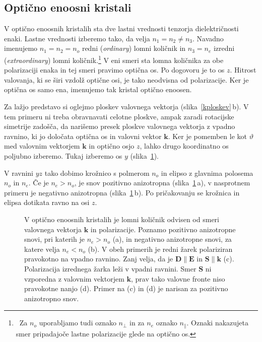 \subsection*{Optično enoosni kristali}
V optično enoosnih kristalih sta dve lastni vrednosti tenzorja dielektričnosti 
enaki. Lastne vrednosti izberemo
tako, da velja $n_{1}=n_{2}\neq n_{3}$. Navadno imenujemo
$n_{1}=n_{2}=n_{o}$ redni (\textit{ordinary})
lomni količnik  in $n_{3}=n_{e}$ izredni 
(\textit{extraordinary}) lomni količnik.\footnote{~Za $n_o$ uporabljamo tudi oznako $n_{\perp}$ in za $n_e$ oznako $n_{\parallel}$. Oznaki
nakazujeta smer pripadajoče lastne polarizacije glede na optično os.}
V eni smeri sta lomna količnika za obe polarizaciji enaka in tej smeri pravimo 
optična os. Po dogovoru je to os $z$. Hitrost valovanja, ki
se širi vzdolž optične osi, je tako neodvisna od polarizacije.
Ker je optična os samo ena, imenujemo tak kristal optično enoosen. 

Za lažjo predstavo si oglejmo ploskev valovnega vektorja (slika~\ref{kploskev}\,b). 
V tem primeru ni treba obravnavati celotne ploskve, ampak zaradi rotacijske simetrije
zadošča, da narišemo presek ploskve valovnega vektorja z vpadno ravnino, ki jo določata 
optična os in valovni vektor $\mathbf{k}$. 
Ker je pomemben le kot $\vartheta$ med valovnim vektorjem $\mathbf{k}$ 
in optično osjo $z$, lahko drugo koordinatno os poljubno izberemo. Tukaj izberemo
os $y$ (slika~\ref{fig:Elipsa}). 

V ravnini $yz$ tako dobimo krožnico s polmerom $n_o$ in elipso z glavnima polosema
$n_o$ in $n_e$. Če je $n_e>n_o$, je snov pozitivno anizotropna (slika~\ref{fig:Elipsa}\,a), 
v nasprotnem primeru je negativno anizotropna (slika~\ref{fig:Elipsa}\,b). Po 
pričakovanju se krožnica in elipsa dotikata ravno na osi $z$. 
\begin{figure}[ht]
\centering
\def\svgwidth{140truemm} 

\caption{V optično enoosnih kristalih je lomni količnik odvisen
od smeri valovnega vektorja $\mathbf{k}$ in polarizacije. 
Poznamo pozitivno anizotropne snovi, pri katerih
je $n_e>n_o$ (a), in negativno anizotropne snovi, 
za katere velja $n_e< n_o$ (b). V obeh primerih je redni 
žarek polariziran pravokotno na vpadno ravnino. Zanj velja, 
da je $\mathbf{D} \parallel \mathbf{E}$ in $\mathbf{S} \parallel \mathbf{k}$ (c). 
Polarizacija izrednega žarka leži v vpadni ravnini. 
Smer $\mathbf{S}$ ni vzporedna z valovnim vektorjem
$\mathbf{k}$, prav tako valovne fronte niso pravokotne nanjo (d). 
Primer na (c) in (d) je narisan za pozitivno 
anizotropno snov.}
\label{fig:Elipsa}
\end{figure}

